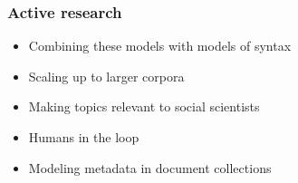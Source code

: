 \iflong

\begin{frame}
	\frametitle{Active research}

	\begin{itemize}
		\item Combining these models with models of syntax
		\item Scaling up to larger corpora
		\item Making topics relevant to social scientists
		\item Humans in the loop
		\item Modeling metadata in document collections
	\end{itemize}
\end{frame}

\fi